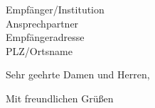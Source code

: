 \documentclass{scrlttr2}
\begin{document}
    \begin{letter}{%
        Empfänger/Institution\\
        Ansprechpartner\\
        Empfängeradresse\\
        PLZ/Ortsname
        }

        \opening{Sehr geehrte Damen und Herren,}

        \lipsum[1-6]

        \closing{Mit freundlichen Grüßen}


    \end{letter}
\end{document}
